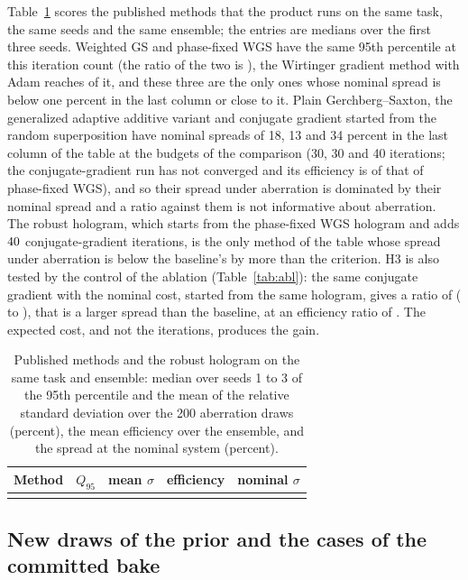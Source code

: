 Table~\ref{tab:pub} scores the published methods that the product runs on the same task, the same seeds and the same ensemble; the entries are medians over the first three seeds. Weighted GS and phase-fixed WGS have the same 95th percentile at this iteration count (the ratio of the two is \pubGSWRatio), the Wirtinger gradient method with Adam reaches \pubWirtRatio{} of it, and these three are the only ones whose nominal spread is below one percent in the last column or close to it. Plain Gerchberg--Saxton,
the generalized adaptive additive variant and conjugate gradient started from the random superposition have nominal spreads of 18, 13 and 34 percent in the last column of the table at the budgets of the comparison (30, 30 and 40 iterations; the conjugate-gradient run has not converged and its efficiency is \pubCGEff{} of that of phase-fixed WGS), and so their spread under aberration is dominated by their nominal spread and a ratio against them is not informative about aberration. The robust hologram, which starts
from the phase-fixed WGS hologram and adds $40$ conjugate-gradient iterations, is the only method of the table whose spread under aberration is below the baseline's by more than the criterion. H3 is also tested by the control of the ablation (Table~\ref{tab:abl}): the same conjugate gradient with the nominal cost, started from the same hologram, gives a ratio of \ablNominalMed{} (\ablNominalMin{} to \ablNominalMax), that is a larger spread than the baseline, at an efficiency ratio of \ablNominalEff. The expected cost, and not the iterations, produces the gain.

\begin{table}[t]
\centering\small
\caption{Published methods and the robust hologram on the same task and ensemble: median over seeds 1 to 3 of the 95th percentile and the mean of the relative standard deviation over the 200 aberration draws (percent), the mean efficiency over the ensemble, and the spread at the nominal system (percent).}
\label{tab:pub}
\begin{tabular}{@{}l r r r r@{}}
\toprule
Method & $Q_{95}$ & mean $\sigma$ & efficiency & nominal $\sigma$\\
\midrule
\\
\bottomrule
\end{tabular}
\end{table}

\subsection{New draws of the prior and the cases of the committed bake}

